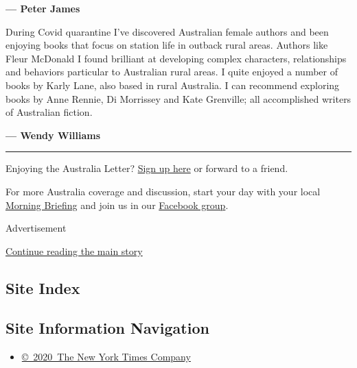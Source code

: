 \textbf{--- Peter James}

During Covid quarantine I've discovered Australian female authors and
been enjoying books that focus on station life in outback rural areas.
Authors like Fleur McDonald I found brilliant at developing complex
characters, relationships and behaviors particular to Australian rural
areas. I quite enjoyed a number of books by Karly Lane, also based in
rural Australia. I can recommend exploring books by Anne Rennie, Di
Morrissey and Kate Grenville; all accomplished writers of Australian
fiction.

\textbf{--- Wendy Williams}

\begin{center}\rule{0.5\linewidth}{\linethickness}\end{center}

Enjoying the Australia Letter?
\href{https://www.nytimes.com/newsletters/australia-letter?module=inline}{Sign
up here} or forward to a friend.

For more Australia coverage and discussion, start your day with your
local
\href{https://www.nytimes.com/interactive/2018/briefing/global-morning-briefing-newsletter-signup.html?utm_source=ausend}{Morning
Briefing} and join us in our
\href{https://www.facebook.com/groups/nytaustralia/}{Facebook group}.

Advertisement

\protect\hyperlink{after-bottom}{Continue reading the main story}

\hypertarget{site-index}{%
\subsection{Site Index}\label{site-index}}

\hypertarget{site-information-navigation}{%
\subsection{Site Information
Navigation}\label{site-information-navigation}}

\begin{itemize}
\tightlist
\item
  \href{https://help.nytimes.com/hc/en-us/articles/115014792127-Copyright-notice}{©~2020~The
  New York Times Company}
\end{itemize}

